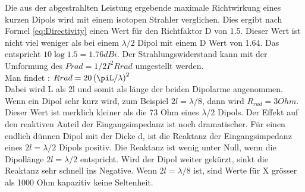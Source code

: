 Die aus der abgestrahlten Leistung ergebende maximale Richtwirkung eines kurzen Dipols wird  mit einem isotopen Strahler verglichen. Dies ergibt nach Formel \ref{eq:Directivity} einen Wert für den Richtfaktor D von 1.5. Dieser Wert ist nicht viel weniger als bei einem $\lambda/2$ Dipol mit einem D Wert von 1.64. Das entspricht $10\log{1.5}=1.76dBi$.
Der Strahlungswiderstand kann mit der Umformung des $Prad=1/2 I^{2}Rrad$ umgestellt werden. \\
Man findet :
$Rrad=20\left(\piL/\lambda\right)^{2}$ \\
Dabei wird L als 2l und somit als länge der beiden Dipolarme angenommen.
Wenn ein Dipol sehr kurz wird, zum Beispiel $2l=\lambda/8$, dann wird $R_{rad} = 3 Ohm$. Dieser Wert ist merklich kleiner als   die 73 Ohm   eines $\lambda/2$ Dipols. Der Effekt auf den reaktiven Anteil der Eingangsimpedanz ist noch dramatischer. Für einen endlich dünnen Dipol mit der Dicke d, ist die Reaktanz der Eingangsimpedanz eines $2l=\lambda/2$ Dipols positiv. Die Reaktanz ist wenig unter Null, wenn die Dipollänge  $2l=\lambda/2$ entspricht. Wird der Dipol weiter gekürzt,  sinkt die Reaktanz sehr schnell ins Negative. Wenn  $2l=\lambda/8$ ist,  sind Werte für X grösser als 1000 Ohm kapazitiv keine Seltenheit. 


